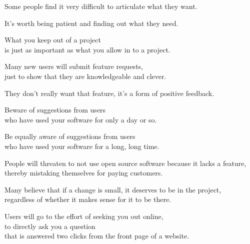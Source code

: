 \documentclass[t,handout,aspectratio=169]{beamer}
\begin{document}
\begin{frame}[fragile]%
    \vfill
    Some people find it very difficult to articulate what they want. \pause

    It's worth being patient and finding out what they need.
\end{frame}

\begin{frame}[fragile]%
    \vfill
    What you keep out of a project \pause \\
    is just as important as what you allow in to a project.
\end{frame}

\begin{frame}[fragile]%
    \vfill
    Many new users will submit feature requests, \\
    just to show that they are knowledgeable and clever. \pause

    They don't really want that feature, it's a form of positive feedback.
\end{frame}

\begin{frame}[fragile]%
    \vfill
    Beware of suggestions from users \\
    who have used your software for only a day or so. \pause

    Be equally aware of suggestions from users \\
    who have used your software for a long, long time.
\end{frame}

\begin{frame}[fragile]%
    \vfill
    People will threaten to not use open source software because it lacks a feature, \pause \\
    thereby mistaking themselves for paying customers.
\end{frame}

\begin{frame}[fragile]%
    \vfill
    Many believe that if a change is small, it deserves to be in the project, \pause \\
    regardless of whether it makes sense for it to be there.
\end{frame}

\begin{frame}[fragile]%
    \vfill
    Users will go to the effort of seeking you out online, \pause \\
    to directly ask you a question \pause \\
    that is answered two clicks from the front page of a website.
\end{frame}
\end{document}
